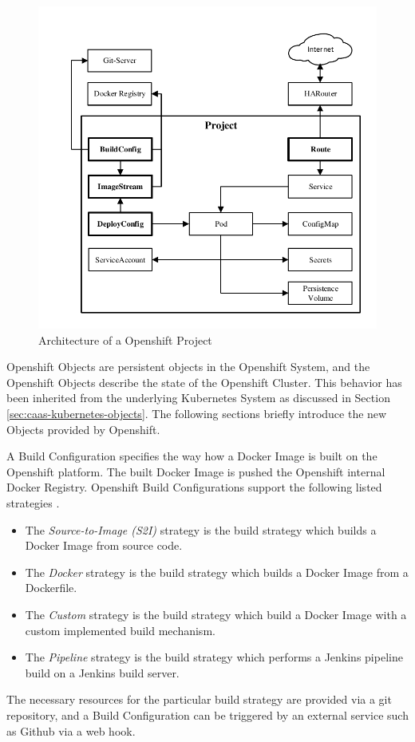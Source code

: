 \begin{figure}[htbp]
	\centering
	\includegraphics[scale=1]{images/openshift-project-architecture.pdf}
	\caption{Architecture of a Openshift Project}
	\label{fig:paas-openshift-project-architecture}
\end{figure} 

Openshift Objects are persistent objects in the Openshift System, and the Openshift Objects describe the state of the Openshift Cluster. This behavior has been inherited from the underlying Kubernetes System as discussed in Section \vref{sec:caas-kubernetes-objects}. The following sections briefly introduce the new Objects provided by Openshift. 

A Build Configuration specifies the way how a Docker Image is built on the Openshift platform. The built Docker Image is pushed the Openshift internal Docker Registry. Openshift Build Configurations support the following listed strategies \cite{S2I2018}.
\begin{itemize}
	\item The \emph{Source-to-Image (S2I)} strategy is the build strategy which builds a Docker Image from source code.
	\item The \emph{Docker} strategy is the build strategy which builds a Docker Image from a Dockerfile.
	\item The \emph{Custom} strategy is the build strategy which build a Docker Image with a custom implemented build mechanism.
	\item The \emph{Pipeline} strategy is the build strategy which performs a Jenkins pipeline build on a Jenkins build server.
\end{itemize}
The necessary resources for the particular build strategy are provided via a git repository, and a Build Configuration can be triggered by an external service such as Github via a web hook. 

